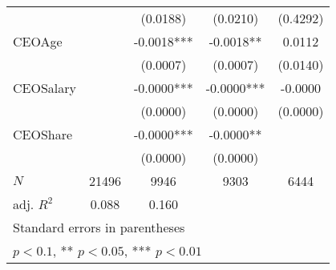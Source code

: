 \begin{table}[htbp]
\begin{tabular}{l*{4}{c}}
            &               &    (0.0188)   &    (0.0210)   &    (0.4292)   \\
[1em]
CEOAge      &               &     -0.0018***&     -0.0018** &      0.0112   \\
            &               &    (0.0007)   &    (0.0007)   &    (0.0140)   \\
[1em]
CEOSalary   &               &     -0.0000***&     -0.0000***&     -0.0000   \\
            &               &    (0.0000)   &    (0.0000)   &    (0.0000)   \\
[1em]
CEOShare    &               &     -0.0000***&     -0.0000** &               \\
            &               &    (0.0000)   &    (0.0000)   &               \\
\hline
\(N\)       &       21496   &        9946   &        9303   &        6444   \\
adj. \(R^{2}\)&       0.088   &       0.160   &               &               \\
\hline\hline
\multicolumn{5}{l}{\footnotesize Standard errors in parentheses}\\
\multicolumn{5}{l}{\footnotesize * \(p<0.1\), ** \(p<0.05\), *** \(p<0.01\)}\\
\end{tabular}
\end{table}
